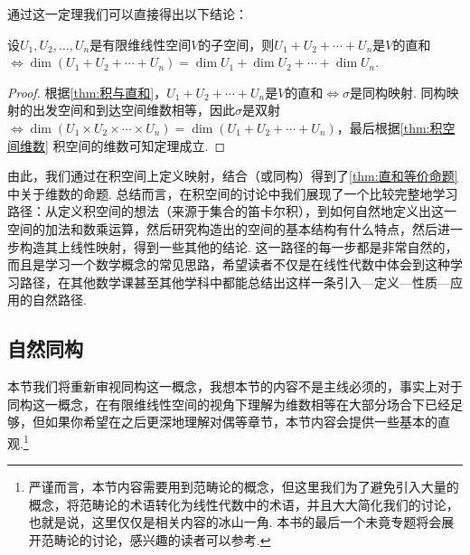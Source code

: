 通过这一定理我们可以直接得出以下结论：
\begin{theorem}{}{}
    设$U_1,U_2,\ldots,U_n$是有限维线性空间$V$的子空间，则$U_1+U_2+\cdots+U_n$是$V$的直和$\iff \dim(U_1+U_2+\cdots+U_n)=\dim U_1+\dim U_2+\cdots+\dim U_n$.
\end{theorem}

\begin{proof}
    根据\autoref{thm:积与直和}，$U_1+U_2+\cdots+U_n$是$V$的直和$\iff \sigma$是同构映射. 同构映射的出发空间和到达空间维数相等，因此$\sigma$是双射$\iff \dim(U_1 \times U_2 \times \cdots \times U_n)=\dim(U_1+U_2+\cdots+U_n)$，最后根据\autoref{thm:积空间维数} 积空间的维数可知定理成立.
\end{proof}

由此，我们通过在积空间上定义映射，结合（或同构）得到了\autoref{thm:直和等价命题} 中关于维数的命题. 总结而言，在积空间的讨论中我们展现了一个比较完整地学习路径：从定义积空间的想法（来源于集合的笛卡尔积），到如何自然地定义出这一空间的加法和数乘运算，然后研究构造出的空间的基本结构有什么特点，然后进一步构造其上线性映射，得到一些其他的结论. 这一路径的每一步都是非常自然的，而且是学习一个数学概念的常见思路，希望读者不仅是在线性代数中体会到这种学习路径，在其他数学课甚至其他学科中都能总结出这样一条引入—定义—性质—应用的自然路径.

\subsection{自然同构} \label{subsec:自然同构}

本节我们将重新审视同构这一概念，我想本节的内容不是主线必须的，事实上对于同构这一概念，在有限维线性空间的视角下理解为维数相等在大部分场合下已经足够，但如果你希望在之后更深地理解对偶等章节，本节内容会提供一些基本的直观.\footnote{严谨而言，本节内容需要用到范畴论的概念，但这里我们为了避免引入大量的概念，将范畴论的术语转化为线性代数中的术语，并且大大简化我们的讨论，也就是说，这里仅仅是相关内容的冰山一角. 本书的最后一个未竟专题将会展开范畴论的讨论，感兴趣的读者可以参考.}


